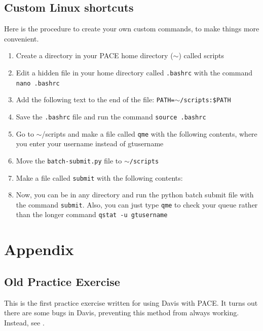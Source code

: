 \documentclass{article}
\begin{document}
    \subsection{Custom Linux shortcuts}
    Here is the procedure to create your own custom commands, to make things more convenient.
    \begin{enumerate}
        \item Create a directory in your PACE home directory ($\sim$) called scripts
        \item Edit a hidden file in your home directory called \texttt{.bashrc} with the command \texttt{nano .bashrc}
        \item Add the following text to the end of the file: \texttt{PATH=$\sim$/scripts:\$PATH}
        \item Save the \texttt{.bashrc} file and run the command \texttt{source .bashrc}
        \item Go to $\sim$/scripts and make a file called \texttt{qme} with the following contents, where you enter your username instead of gtusername
        \item Move the \texttt{batch-submit.py} file to \texttt{$\sim$/scripts}
        \item Make a file called \texttt{submit} with the following contents:
        \item Now, you can be in any directory and run the python batch submit file with the command \texttt{submit}.  Also, you can just type \texttt{qme} to check your queue rather than the longer command \texttt{qstat -u gtusername}
    \end{enumerate}
    
	\section{Appendix}
	\subsection{Old Practice Exercise}
	\label{OldExercise}
	This is the first practice exercise written for using Davis with PACE.  It turns out there are some bugs in Davis, preventing this method from always working.  Instead, see .
	
\end{document}

